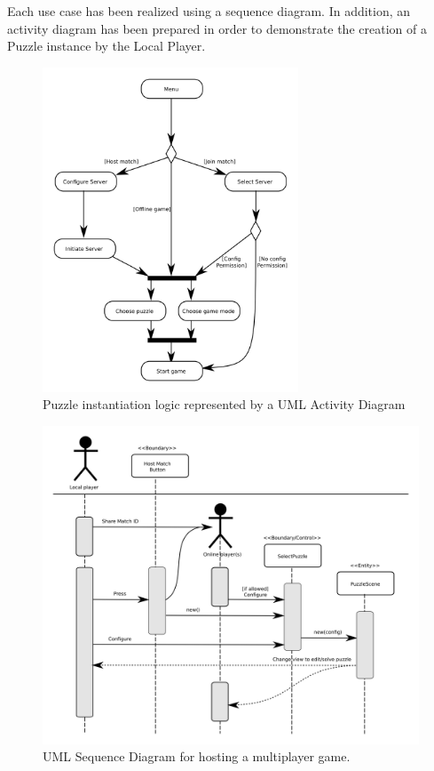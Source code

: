 \documentclass[12pt]{article}
\begin{document}
Each use case has been realized using a sequence diagram. In addition, an
activity diagram has been prepared in order to demonstrate the creation of a
Puzzle instance by the Local Player.
    \begin{figure}[H]
        \centering
        \includegraphics[width=3in]{activity_all.png}
        \caption{Puzzle instantiation logic represented by a UML Activity Diagram}
    \end{figure}


    \begin{figure}[H]
        \centering
        \includegraphics[width=4.5in]{sequence_host_match.png}
        \caption{UML Sequence Diagram for hosting a multiplayer game.}
    \end{figure}
\end{document}
